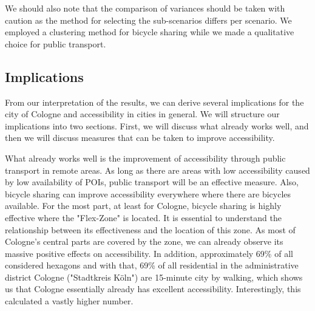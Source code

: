 We should also note that the comparison of variances should be taken with caution as the method for selecting the sub-scenarios differs per scenario.
We employed a clustering method for bicycle sharing while we made a qualitative choice for public transport. 

\subsection{Implications}
\label{sec:implications}

From our interpretation of the results, we can derive several implications for the city of Cologne and accessibility in cities in general.
We will structure our implications into two sections. First, we will discuss what already works well, and then we will discuss measures that can be taken to improve accessibility.

What already works well is the improvement of accessibility through public transport in remote areas.
As long as there are areas with low accessibility caused by low availability of POIs, public transport will be an effective measure.
Also, bicycle sharing can improve accessibility everywhere where there are bicycles available.
For the most part, at least for Cologne, bicycle sharing is highly effective where the "Flex-Zone" is located.
It is essential to understand the relationship between its effectiveness and the location of this zone.
As most of Cologne's central parts are covered by the zone, we can already observe its massive positive effects on accessibility.
In addition, approximately 69\% of all considered hexagons and with that, 69\% of all residential in the administrative district Cologne ("Stadtkreis Köln") are 15-minute city by walking, which shows us that Cologne essentially already has excellent accessibility.
Interestingly, this  calculated a vastly higher number. 


